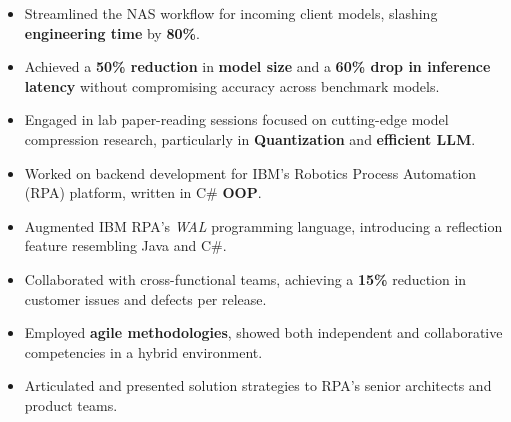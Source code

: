 \documentclass[10pt,a4paper,ragged2e,withhyper]{altacv}
\begin{document}
\begin{paracol}{2}
\begin{itemize}
        \item Streamlined the NAS workflow for incoming client models, slashing
              \textbf{engineering time} by \textbf{80\%}.

        \item Achieved a \textbf{50\% reduction} in \textbf{model size} and a
              \textbf{60\% drop in inference latency} without compromising accuracy across benchmark models.

        \item Engaged in lab paper-reading sessions focused on cutting-edge model compression
              research, particularly in \textbf{Quantization} and \textbf{efficient LLM}.


    \end{itemize}

    \divider{}


    \begin{itemize}

        \item Worked on backend development for IBM's Robotics Process Automation (RPA) platform, written in C\# \textbf{OOP}.

        \item Augmented IBM RPA's \textit{WAL} programming
              language, introducing a reflection feature resembling Java and C\#.

        \item Collaborated with cross-functional teams, achieving a \textbf{15\%} reduction in customer issues and defects per release.

        \item Employed \textbf{agile methodologies}, showed both independent and
              collaborative competencies in a hybrid environment.

        \item Articulated and presented solution strategies to RPA's senior architects and product teams.



\end{itemize}
\end{paracol}
\end{document}
